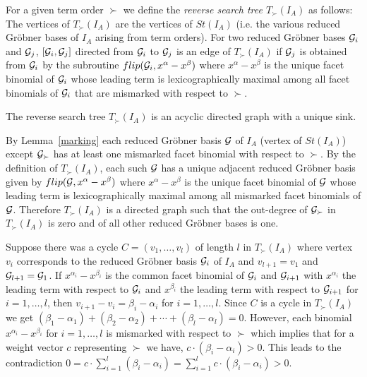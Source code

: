 \documentclass[11pt]{article}
\begin{document}
\begin{definition} \label{def-tree}
For a given term order $\succ$ we define the 
{\em reverse search tree $T_\succ(I_A)$} as follows:\\
The vertices of $T_{\succ}(I_A)$ are the vertices of $St(I_A)$ 
(i.e. the various reduced Gr\"obner bases of $I_A$ arising 
from term orders). For two reduced Gr\"obner bases ${\cal G}_i$ and 
${\cal G}_j$, $[{\cal G}_i,{\cal G}_j]$ directed from 
${\cal G}_i$ to ${\cal G}_j$ is an edge of 
$T_\succ(I_A)$ if ${\cal G}_j$ is obtained from ${\cal G}_i$ by the
subroutine $flip({\cal G}_i,x^{\alpha} - x^{\beta})$ where $x^{\alpha} -
x^{\beta}$ is the unique facet binomial of ${\cal G}_i$ 
whose leading term is lexicographically maximal 
among all facet binomials of ${\cal G}_i$ that are mismarked with
respect to $\succ$.  
\end{definition}


\begin{theorem} 
The reverse search tree $T_\succ(I_A)$ is an acyclic directed graph
with a unique sink. 
\end{theorem}

By Lemma~\ref{marking} each reduced Gr\"obner basis ${\cal G}$ of
$I_A$ (vertex of $St(I_A)$) except ${\cal G}_\succ$ has at least one
mismarked facet binomial with respect to $\succ$. By the definition of 
$T_\succ(I_A)$, each such ${\cal G}$ has a unique adjacent 
reduced Gr\"obner basis given by $flip({\cal G},x^{\alpha} -
x^{\beta})$ where $x^{\alpha} - x^{\beta}$ is the unique facet
binomial of ${\cal G}$ whose leading term is lexicographically maximal
among all mismarked facet binomials of ${\cal G}$. Therefore 
$T_\succ(I_A)$ is a directed graph such that the 
out-degree of ${\cal G}_{\succ}$ in $T_\succ(I_A)$ is zero and of all
other reduced Gr\"obner bases is one. 

Suppose there was a cycle $C = (v_1, \ldots, v_l)$ of length $l$ in
$T_\succ(I_A)$ where vertex $v_i$ corresponds to the reduced 
Gr\"obner basis ${\cal G}_i$ of $I_A$ and $v_{l+1} = v_1$ and 
${\cal G}_{l+1} = {\cal G}_1$. If $x^{\alpha_i}-x^{\beta_i}$ is 
the common facet binomial of ${\cal G}_i$ and ${\cal G}_{i+1}$ with
$x^{\alpha_i}$ the leading term with respect to ${\cal G}_i$ and
$x^{\beta_i}$ the leading term with respect to ${\cal G}_{i+1}$
for $i=1,\ldots,l$, then $v_{i+1} - v_i = 
\beta_i - \alpha_i$ for $i=1,\ldots, l$. Since $C$ is a cycle in
$T_\succ(I_A)$ we get $(\beta_1 - \alpha_1) + (\beta_2 -
\alpha_2) + \cdots + (\beta_l - \alpha_l) = 0$. However, each binomial 
$x^{\alpha_i}-x^{\beta_i}$ for $i=1,\ldots,l$ is mismarked with
respect to $\succ$ which implies that for a weight vector $c$
representing $\succ$ we have, $c \cdot (\beta_i - \alpha_i) > 0$.
This leads to the contradiction 
$0 = c \cdot 
\sum_{i=1}^{l} ({\beta_i}-{\alpha_i}) = \sum_{i=1}^{l} 
c \cdot (\beta_i - \alpha_i) > 0 $.
\end{document}
